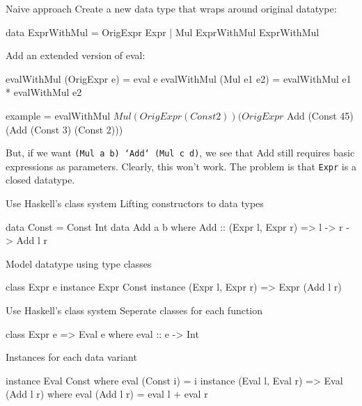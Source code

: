 \documentclass[10pt, compress]{beamer}
\newcommand{\inlinecode}[2]{\colorbox{backg}{\scriptsize{\texttt{#2}}}}
\newenvironment{slide}[1]{\begin{frame}[fragile,environment=slide]{#1}}{\end{frame}}
\newenvironment{slide}[2]{\begin{frame}[fragile,environment=slide]{#1}{#2}}{\end{frame}}
\begin{document}
\begin{slide}{Naive approach}
Create a new data type that wraps around original datatype:
\begin{haskell}
data ExprWithMul = OrigExpr Expr
                 | Mul ExprWithMul ExprWithMul
\end{haskell}
Add an extended version of eval:
\begin{haskell}
evalWithMul (OrigExpr e) = eval e
evalWithMul (Mul e1 e2) = evalWithMul e1 * evalWithMul e2

example = evalWithMul $ Mul (OrigExpr (Const 2)) (OrigExpr $ Add (Const 45) (Add (Const 3) (Const 2)))
\end{haskell}
But, if we want \inlinecode{haskell}{(Mul a b) `Add` (Mul c d)}, we see that Add still requires basic expressions as parameters.
Clearly, this won't work. The problem is that \inlinecode{haskell}{Expr} is a closed datatype.
\end{slide}


\begin{slide}{Use Haskell's class system}
Lifting constructors to data types
\begin{haskell}
data Const = Const Int
data Add a b where
  Add :: (Expr l, Expr r) => l -> r -> Add l r 
\end{haskell}

Model datatype using type classes
\begin{haskell}
class Expr e 
instance Expr Const
instance (Expr l, Expr r) => Expr (Add l r)
\end{haskell} %

\end{slide}

\begin{slide}{Use Haskell's class system}
Seperate classes for each function
\begin{haskell}
class Expr e => Eval e where
 eval :: e -> Int
\end{haskell} %
Instances for each data variant
\begin{haskell}
instance Eval Const where
 eval (Const i) = i
instance (Eval l, Eval r) => Eval (Add l r) where
 eval (Add l r) = eval l + eval r
\end{haskell}
\end{slide}
\end{document}

